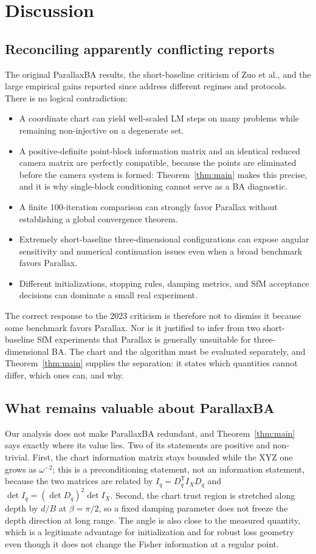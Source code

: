 \documentclass[11pt,a4paper]{article}
\theoremstyle{definition}
\theoremstyle{remark}
\newcommand{\T}{\mathsf{T}}
\begin{document}
\section{Discussion}
\subsection{Reconciling apparently conflicting reports}
The original ParallaxBA results, the short-baseline criticism of Zuo et al., and the large empirical gains reported since address different regimes and protocols. There is no logical contradiction:
\begin{itemize}[leftmargin=2em]
  \item A coordinate chart can yield well-scaled LM steps on many problems while remaining non-injective on a degenerate set.
  \item A positive-definite point-block information matrix and an identical reduced camera matrix are perfectly compatible, because the points are eliminated before the camera system is formed: Theorem~\ref{thm:main} makes this precise, and it is why single-block conditioning cannot serve as a BA diagnostic.
  \item A finite 100-iteration comparison can strongly favor Parallax without establishing a global convergence theorem.
  \item Extremely short-baseline three-dimensional configurations can expose angular sensitivity and numerical continuation issues even when a broad benchmark favors Parallax.
  \item Different initializations, stopping rules, damping metrics, and SfM acceptance decisions can dominate a small real experiment.
\end{itemize}
The correct response to the 2023 criticism is therefore not to dismiss it because some benchmark favors Parallax. Nor is it justified to infer from two short-baseline SfM experiments that Parallax is generally unsuitable for three-dimensional BA. The chart and the algorithm must be evaluated separately, and Theorem~\ref{thm:main} supplies the separation: it states which quantities cannot differ, which ones can, and why.

\subsection{What remains valuable about ParallaxBA}
Our analysis does not make ParallaxBA redundant, and Theorem~\ref{thm:main} says exactly where its value lies. Two of its statements are positive and non-trivial. First, the chart information matrix stays bounded while the XYZ one grows as $\omega^{-2}$; this is a preconditioning statement, not an information statement, because the two matrices are related by $I_q=D_q^{\T}I_XD_q$ and $\det I_q=(\det D_q)^{2}\det I_X$. Second, the chart trust region is stretched along depth by $d/B$ at $\beta=\pi/2$, so a fixed damping parameter does not freeze the depth direction at long range. The angle is also close to the measured quantity, which is a legitimate advantage for initialization and for robust loss geometry even though it does not change the Fisher information at a regular point.
\end{document}

